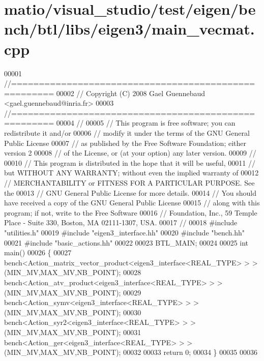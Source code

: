 \hypertarget{matio_2visual__studio_2test_2eigen_2bench_2btl_2libs_2eigen3_2main__vecmat_8cpp_source}{}\section{matio/visual\+\_\+studio/test/eigen/bench/btl/libs/eigen3/main\+\_\+vecmat.cpp}
\label{matio_2visual__studio_2test_2eigen_2bench_2btl_2libs_2eigen3_2main__vecmat_8cpp_source}

\begin{DoxyCode}
00001 \textcolor{comment}{//=====================================================}
00002 \textcolor{comment}{// Copyright (C) 2008 Gael Guennebaud <gael.guennebaud@inria.fr>}
00003 \textcolor{comment}{//=====================================================}
00004 \textcolor{comment}{//}
00005 \textcolor{comment}{// This program is free software; you can redistribute it and/or}
00006 \textcolor{comment}{// modify it under the terms of the GNU General Public License}
00007 \textcolor{comment}{// as published by the Free Software Foundation; either version 2}
00008 \textcolor{comment}{// of the License, or (at your option) any later version.}
00009 \textcolor{comment}{//}
00010 \textcolor{comment}{// This program is distributed in the hope that it will be useful,}
00011 \textcolor{comment}{// but WITHOUT ANY WARRANTY; without even the implied warranty of}
00012 \textcolor{comment}{// MERCHANTABILITY or FITNESS FOR A PARTICULAR PURPOSE.  See the}
00013 \textcolor{comment}{// GNU General Public License for more details.}
00014 \textcolor{comment}{// You should have received a copy of the GNU General Public License}
00015 \textcolor{comment}{// along with this program; if not, write to the Free Software}
00016 \textcolor{comment}{// Foundation, Inc., 59 Temple Place - Suite 330, Boston, MA  02111-1307, USA.}
00017 \textcolor{comment}{//}
00018 \textcolor{preprocessor}{#include "utilities.h"}
00019 \textcolor{preprocessor}{#include "eigen3\_interface.hh"}
00020 \textcolor{preprocessor}{#include "bench.hh"}
00021 \textcolor{preprocessor}{#include "basic\_actions.hh"}
00022 
00023 BTL\_MAIN;
00024 
00025 \textcolor{keywordtype}{int} main()
00026 \{
00027   bench<Action\_matrix\_vector\_product<eigen3\_interface<REAL\_TYPE> > >(MIN\_MV,MAX\_MV,NB\_POINT);
00028   bench<Action\_atv\_product<eigen3\_interface<REAL\_TYPE> > >(MIN\_MV,MAX\_MV,NB\_POINT);
00029   bench<Action\_symv<eigen3\_interface<REAL\_TYPE> > >(MIN\_MV,MAX\_MV,NB\_POINT);
00030   bench<Action\_syr2<eigen3\_interface<REAL\_TYPE> > >(MIN\_MV,MAX\_MV,NB\_POINT);
00031   bench<Action\_ger<eigen3\_interface<REAL\_TYPE> > >(MIN\_MV,MAX\_MV,NB\_POINT);
00032 
00033   \textcolor{keywordflow}{return} 0;
00034 \}
00035 
00036 
\end{DoxyCode}
